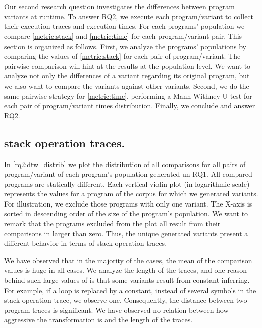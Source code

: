 \section{\rqtwo}



Our second research question investigates the differences between program variants at runtime.
To answer RQ2, we execute each program/variant to collect their execution traces and execution times.
For each programs' population we compare \autoref{metric:stack} and \autoref{metric:time} for each program/variant pair.
This section is organized as follows. First, we analyze the programs' populations by comparing the values of \autoref{metric:stack} for each pair of program/variant. The pairwise comparison will hint at the results at the population level. We want to analyze not only the differences of a variant regarding its original program, but we also want to compare the variants against other variants. Second, we do the same pairwise strategy for \autoref{metric:time}, performing a Mann-Withney U test for each pair of program/variant times distribution. Finally, we conclude and answer RQ2.

\subsection*{stack operation traces.}

In \autoref{rq2:dtw_distrib} we plot the distribution of all \DTW comparisons for all pairs of program/variant of each program's population generated un RQ1. All compared programs are statically different. Each vertical violin plot (in logarithmic scale) represents the \DTW values for a program of the \corpusrosetta corpus for which we generated variants. For illustration, we exclude those programs with only one variant. The X-axis is sorted in descending order of the size of the program's population. We want to remark that the programs excluded from the plot all result from their comparisons in \DTW larger than zero. Thus, the unique generated variants present a different behavior in terms of stack operation traces.


We have observed that in the majority of the cases, the mean of the comparison values is huge in all cases. We analyze the length of the traces, and one reason behind such large values of \DTW is that some variants result from constant inferring. For example, if a loop is replaced by a constant, instead of several symbols in the stack operation trace, we observe one. Consequently, the distance between two program traces is significant. We have observed no relation between how aggressive the transformation is and the length of the traces.  

